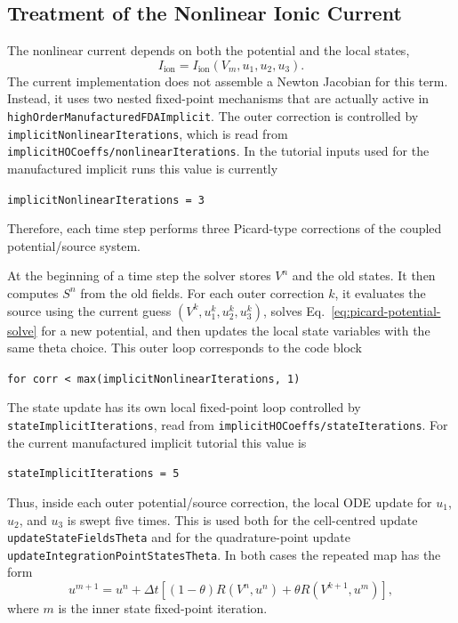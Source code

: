 \documentclass[11pt,a4paper]{article}
\newcommand{\code}[1]{\texttt{#1}}
\begin{document}
\subsection{Treatment of the Nonlinear Ionic Current}
The nonlinear current depends on both the potential and the local states,
\begin{equation}
I_{\mathrm{ion}}=I_{\mathrm{ion}}(V_m,u_1,u_2,u_3).
\end{equation}
The current implementation does not assemble a Newton Jacobian for this term.
Instead, it uses two nested fixed-point mechanisms that are actually active in
\code{highOrderManufacturedFDAImplicit}. The outer correction is controlled by
\code{implicitNonlinearIterations}, which is read from
\code{implicitHOCoeffs/nonlinearIterations}. In the tutorial inputs used for the
manufactured implicit runs this value is currently
\begin{center}
\code{implicitNonlinearIterations = 3}
\end{center}
Therefore, each time step performs three Picard-type corrections of the coupled
potential/source system.

At the beginning of a time step the solver stores $V^n$ and the old states. It
then computes $S^n$ from the old fields. For each outer correction $k$, it
evaluates the source using the current guess $(V^k,u_1^k,u_2^k,u_3^k)$, solves
Eq.~\eqref{eq:picard-potential-solve} for a new potential, and then updates the
local state variables with the same theta choice. This outer loop corresponds to
the code block
\begin{center}
\code{for corr < max(implicitNonlinearIterations, 1)}
\end{center}

The state update has its own local fixed-point loop controlled by
\code{stateImplicitIterations}, read from \code{implicitHOCoeffs/stateIterations}.
For the current manufactured implicit tutorial this value is
\begin{center}
\code{stateImplicitIterations = 5}
\end{center}
Thus, inside each outer potential/source correction, the local ODE update for
$u_1$, $u_2$, and $u_3$ is swept five times. This is used both for the
cell-centred update \code{updateStateFieldsTheta} and for the quadrature-point
update \code{updateIntegrationPointStatesTheta}. In both cases the repeated map
has the form
\begin{equation}
u^{m+1} = u^n + \Delta t\left[(1-\theta)R(V^n,u^n)
+ \theta R(V^{k+1},u^m)\right],
\end{equation}
where $m$ is the inner state fixed-point iteration.
\end{document}
